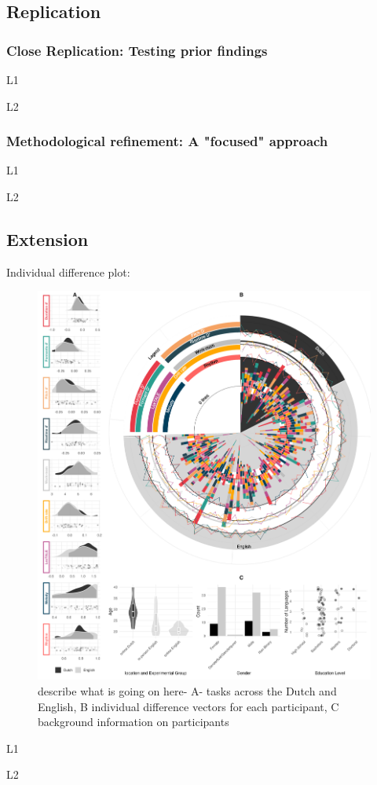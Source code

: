 \subsection{Replication}

\subsubsection{Close Replication: Testing prior findings}

L1 

L2

\subsubsection{Methodological refinement: A "focused" approach}

L1 

L2

\subsection{Extension}

Individual difference plot:
\clearpage
\begin{figure}[p]  %
    \centering
    \includegraphics[width=\textwidth,height=\textheight,keepaspectratio]{viz/combined_plot_circle.png}
    \caption{describe what is going on here- A- tasks across the Dutch and English, B individual difference vectors for each participant, C background information on participants}
    \label{fig:combined_plot}
\end{figure}
\clearpage

L1 

L2


